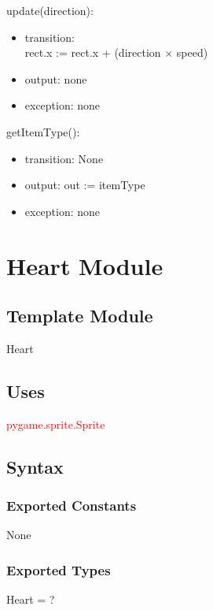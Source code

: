 \documentclass[12pt]{article}
\begin{document}
\noindent update(direction):
\begin{itemize}
\item transition: \\
rect.x := rect.x + (direction $\times$ speed)
\item output: none
\item exception: none
\end{itemize}

\noindent getItemType():
\begin{itemize}
\item transition: None
\item output: out := itemType
\item exception: none
\end{itemize}

\newpage


\section{Heart Module}

\subsection*{Template Module}
Heart

\subsection*{Uses}
\textcolor{red}{pygame.sprite.Sprite}

\subsection*{Syntax}
\subsubsection*{Exported Constants}
None
\subsubsection*{Exported Types}
Heart = ?
\end{document}
